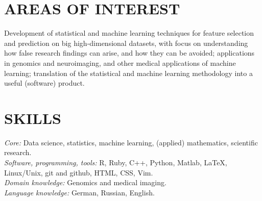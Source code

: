 \documentclass[overlapped, line, 10pt]{res} %
\begin{document}


\address{
  Web: \href{http://www.alexejgossmann.com/}{alexejgossmann.com} \textbar
  LinkedIn: \href{https://www.linkedin.com/in/alexejgossmann/}{alexejgossmann} \textbar
  Github: \href{https://github.com/agisga}{agisga} \textbar
  Email: \href{mailto:agossman@tulane.edu}{agossman@tulane.edu}
}


\begin{resume}




\section{AREAS OF INTEREST}

Development of statistical and machine learning techniques for feature selection and prediction on big high-dimensional datasets, with focus on understanding how false research findings can arise, and how they can be avoided;
applications in genomics and neuroimaging, and other medical applications of machine learning;
translation of the statistical and machine learning methodology into a useful (software) product.


\section{SKILLS}

{\sl Core:} Data science, statistics, machine learning, (applied) mathematics, scientific research.\\
{\sl Software, programming, tools:} R, Ruby, C++, Python, Matlab, \LaTeX, Linux/Unix, git and github, HTML, CSS, Vim.\\
{\sl Domain knowledge:} Genomics and medical imaging.\\
{\sl Language knowledge:} German, Russian, English.


\end{resume}
\end{document}
